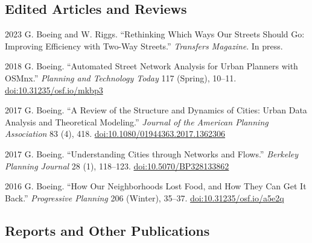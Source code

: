 \documentclass[11pt,letterpaper]{report}
\begin{document}
    \subsection*{Edited Articles and Reviews}

    \begin{tablist}

        \item[2023] \tab{}G. Boeing and W. Riggs. \enquote{Rethinking Which Ways Our Streets Should Go: Improving Efficiency with Two-Way Streets.} \textit{Transfers Magazine}. In press.

        \item[2018] \tab{}G. Boeing. \enquote{Automated Street Network Analysis for Urban Planners with OSMnx.} \textit{Planning and Technology Today} 117 (Spring), 10--11. \href{https://doi.org/10.31235/osf.io/mkbp3}{doi:10.31235/osf.io/mkbp3}

        \item[2017] \tab{}G. Boeing. \enquote{A Review of the Structure and Dynamics of Cities: Urban Data Analysis and Theoretical Modeling.} \textit{Journal of the American Planning Association} 83 (4), 418. \href{https://doi.org/10.1080/01944363.2017.1362306}{doi:10.1080/01944363.2017.1362306}

        \item[2017] \tab{}G. Boeing. \enquote{Understanding Cities through Networks and Flows.} \textit{Berkeley Planning Journal} 28 (1), 118--123. \href{https://doi.org/10.5070/BP328133862}{doi:10.5070/BP328133862}

        \item[2016] \tab{}G. Boeing. \enquote{How Our Neighborhoods Lost Food, and How They Can Get It Back.} \textit{Progressive Planning} 206 (Winter), 35--37. \href{https://doi.org/10.31235/osf.io/a5e2q}{doi:10.31235/osf.io/a5e2q}

    \end{tablist}



    \subsection*{Reports and Other Publications}
\end{document}
